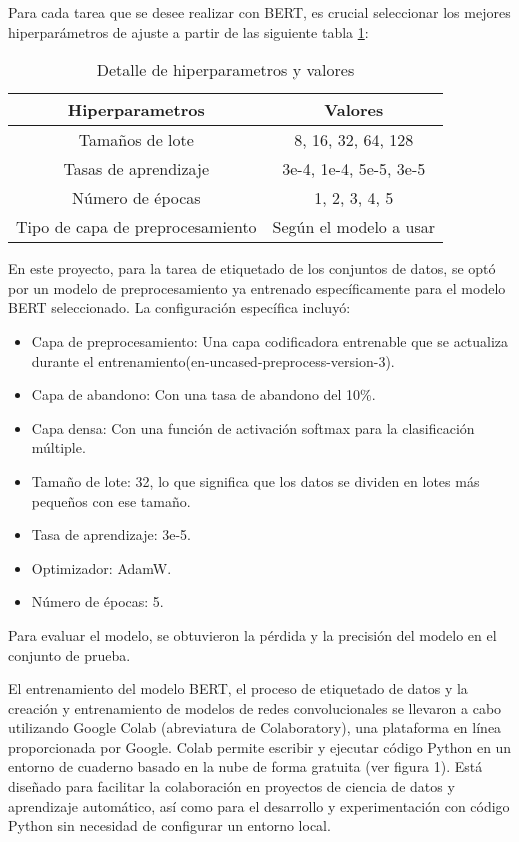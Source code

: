 Para cada tarea que se desee realizar con BERT, es crucial seleccionar los mejores hiperparámetros de ajuste a partir de las siguiente tabla \ref{tbl:2}:

\begin{table}[!ht]
	\centering
	\begin{tabular}{|c|c|}
		\hline
		\textbf{Hiperparametros} & \textbf{Valores} \\ \hline
		Tamaños de lote & 8, 16, 32, 64, 128 \\ \hline
		Tasas de aprendizaje & 3e-4, 1e-4, 5e-5, 3e-5 \\ \hline
		Número de épocas &  1, 2, 3, 4, 5 \\ \hline
		Tipo de capa de preprocesamiento & Según el modelo a usar \\ \hline
	\end{tabular}
	\caption{Detalle de hiperparametros y valores}
	\label{tbl:2}
\end{table}

En este proyecto, para la tarea de etiquetado de los conjuntos de datos, se optó por un modelo de preprocesamiento ya entrenado específicamente para el modelo BERT seleccionado. La configuración específica incluyó:

\begin{itemize}

\item Capa de preprocesamiento: Una capa codificadora entrenable que se actualiza durante el entrenamiento(en-uncased-preprocess-version-3).
\item Capa de abandono: Con una tasa de abandono del 10\%.
\item Capa densa: Con una función de activación softmax para la clasificación múltiple.
\item Tamaño de lote: 32, lo que significa que los datos se dividen en lotes más pequeños con ese tamaño.
\item Tasa de aprendizaje: 3e-5.
\item Optimizador: AdamW.
\item Número de épocas: 5.

\end{itemize}

Para evaluar el modelo, se obtuvieron la pérdida y la precisión del modelo en el conjunto de prueba.

El entrenamiento del modelo BERT, el proceso de etiquetado de datos y la creación y entrenamiento de modelos de redes convolucionales se llevaron a cabo utilizando Google Colab (abreviatura de Colaboratory), una plataforma en línea proporcionada por Google. Colab permite escribir y ejecutar código Python en un entorno de cuaderno basado en la nube de forma gratuita (ver figura 1). Está diseñado para facilitar la colaboración en proyectos de ciencia de datos y aprendizaje automático, así como para el desarrollo y experimentación con código Python sin necesidad de configurar un entorno local.

